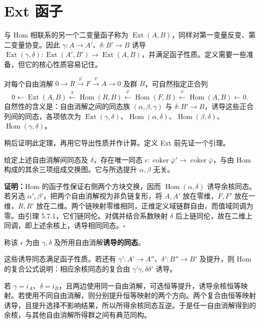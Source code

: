 \section{Ext 函子}
与 Hom 相联系的另一个二变量函子称为 $\operatorname{Ext}(A,B)$，同样对第一变量反变、第二变量协变。因此 $\gamma:A\to A'$、$\delta:B'\to B$ 诱导 $\operatorname{Ext}(\gamma,\delta):\operatorname{Ext}(A',B')\to\operatorname{Ext}(A,B)$，并满足函子性质。定义需要一些准备，但它的核心性质容易记住。

对每个自由消解 $0\to R\xrightarrow{\varphi}F\xrightarrow{\psi}A\to0$ 及群 $B$，可自然指定正合列
\[
0\leftarrow\operatorname{Ext}(A,B)\xleftarrow{\pi}\operatorname{Hom}(R,B)
\xleftarrow{\overline\varphi}\operatorname{Hom}(F,B)
\xleftarrow{\overline\psi}\operatorname{Hom}(A,B)\leftarrow0.
\]
自然性的含义是：自由消解之间的同态族 $(\alpha,\beta,\gamma)$ 与 $\delta:B'\to B$，诱导这些正合列间的同态，各项依次为 $\operatorname{Ext}(\gamma,\delta)$、$\operatorname{Hom}(\alpha,\delta)$、$\operatorname{Hom}(\beta,\delta)$、$\operatorname{Hom}(\gamma,\delta)$。

稍后证明此定理，再用它导出性质并作计算。定义 Ext 前先证一个引理。

给定上述自由消解间同态及 $\delta$，存在唯一同态 $\epsilon:\operatorname{coker}\overline\varphi'\to\operatorname{coker}\overline\varphi$，与由 Hom 构成的其余三项组成交换图。它与所选提升 $\alpha,\beta$ 无关。

\textbf{证明：}Hom 的函子性保证右侧两个方块交换，因而 $\operatorname{Hom}(\alpha,\delta)$ 诱导余核同态。若另选 $\alpha',\beta'$，把两个自由消解视为非负链复形，将 $A,A'$ 放在零维，$F,F'$ 放在一维，$R,R'$ 放在二维。两个链映射零维相同，正维定义域链群自由，而值域同调为零。由引理 5.7.1，它们链同伦。对偶并结合系数映射 $\delta$ 后上链同伦，故在二维上同调，即上述余核上，诱导相同同态。\hfill$\square$

称该 $\epsilon$ 为由 $\gamma,\delta$ 及所用自由消解\textbf{诱导的同态}。

这些诱导同态满足函子性质。若还有 $\gamma':A'\to A''$、$\delta':B''\to B'$ 及提升，则 Hom 的复合公式说明：相应余核同态的复合由 $\gamma'\gamma,\delta\delta'$ 诱导。

若 $\gamma=i_A$、$\delta=i_B$，且两边使用同一自由消解，可选恒等提升，诱导余核恒等映射。若使用不同自由消解，则分别提升恒等映射的两个方向。两个复合由恒等映射诱导，且提升选择不影响结果，所以所得余核同态互逆。于是任一自由消解得到的余核，与其他自由消解所得群之间有典范同构。

